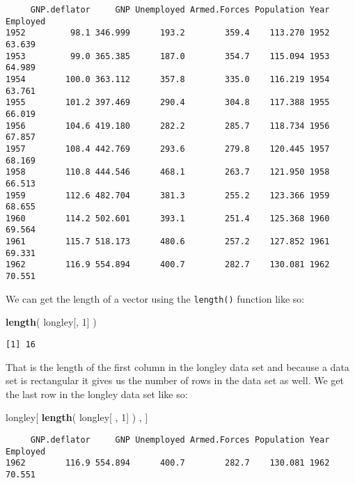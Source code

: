 \documentclass[]{article}
\newenvironment{Shaded}{\begin{snugshade}}{\end{snugshade}}
\newcommand{\DecValTok}[1]{\textcolor[rgb]{0.00,0.00,0.81}{#1}}
\newcommand{\KeywordTok}[1]{\textcolor[rgb]{0.13,0.29,0.53}{\textbf{#1}}}
\newcommand{\NormalTok}[1]{#1}
\begin{document}
\begin{verbatim}
     GNP.deflator     GNP Unemployed Armed.Forces Population Year Employed
1952         98.1 346.999      193.2        359.4    113.270 1952   63.639
1953         99.0 365.385      187.0        354.7    115.094 1953   64.989
1954        100.0 363.112      357.8        335.0    116.219 1954   63.761
1955        101.2 397.469      290.4        304.8    117.388 1955   66.019
1956        104.6 419.180      282.2        285.7    118.734 1956   67.857
1957        108.4 442.769      293.6        279.8    120.445 1957   68.169
1958        110.8 444.546      468.1        263.7    121.950 1958   66.513
1959        112.6 482.704      381.3        255.2    123.366 1959   68.655
1960        114.2 502.601      393.1        251.4    125.368 1960   69.564
1961        115.7 518.173      480.6        257.2    127.852 1961   69.331
1962        116.9 554.894      400.7        282.7    130.081 1962   70.551
\end{verbatim}

We can get the length of a vector using the \texttt{length()} function like so:

\begin{Shaded}
\begin{Highlighting}[]
\KeywordTok{length}\NormalTok{( longley[, }\DecValTok{1}\NormalTok{] )}
\end{Highlighting}
\end{Shaded}

\begin{verbatim}
[1] 16
\end{verbatim}

That is the length of the first column in the longley data set and because a data set is rectangular it gives us the number of rows in the data set as well. We get the last row in the longley data set like so:

\begin{Shaded}
\begin{Highlighting}[]
\NormalTok{longley[ }\KeywordTok{length}\NormalTok{( longley[ , }\DecValTok{1}\NormalTok{] ) , ]}
\end{Highlighting}
\end{Shaded}

\begin{verbatim}
     GNP.deflator     GNP Unemployed Armed.Forces Population Year Employed
1962        116.9 554.894      400.7        282.7    130.081 1962   70.551
\end{verbatim}
\end{document}
